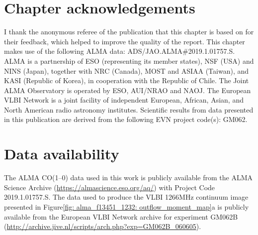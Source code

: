 \vspace*{\fill}

\section*{Chapter acknowledgements}

I thank the anonymous referee of the publication that this chapter is based on for their feedback, which helped to improve the quality of the report. This chapter makes use of the following ALMA data: ADS/JAO.ALMA\#2019.1.01757.S. ALMA is a partnership of ESO (representing its member states), NSF (USA) and NINS (Japan), together with NRC (Canada), MOST and ASIAA (Taiwan), and KASI (Republic of Korea), in cooperation with the Republic of Chile. The Joint ALMA Observatory is operated by ESO, AUI/NRAO and NAOJ. The European VLBI Network is a joint facility of independent European, African, Asian, and North American radio astronomy institutes. Scientific results from data presented in this publication are derived from the following EVN project code(s): GM062.

\section*{Data availability}

The ALMA CO(1--0) data used in this work is publicly available from the ALMA Science Archive (\url{https://almascience.eso.org/aq/}) with Project Code 2019.1.01757.S. The data used to produce the VLBI 1266\;MHz continuum image presented in Figure\;\ref{fig: alma_f13451_1232: outflow_moment_map}a is publicly available from the European VLBI Network archive for experiment GM062B (\url{http://archive.jive.nl/scripts/arch.php?exp=GM062B_060605}).
